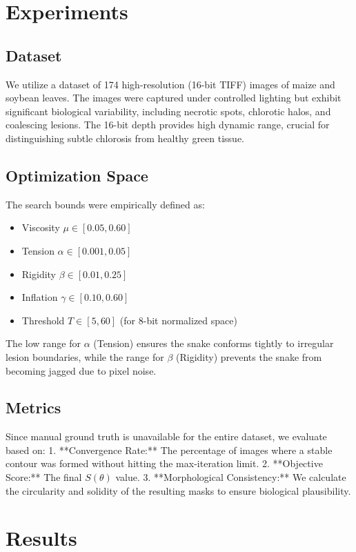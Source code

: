 \documentclass[journal]{IEEEtran}
\begin{document}
\section{Experiments}
\subsection{Dataset}
We utilize a dataset of 174 high-resolution (16-bit TIFF) images of maize and soybean leaves. The images were captured under controlled lighting but exhibit significant biological variability, including necrotic spots, chlorotic halos, and coalescing lesions. The 16-bit depth provides high dynamic range, crucial for distinguishing subtle chlorosis from healthy green tissue.

\subsection{Optimization Space}
The search bounds were empirically defined as:
\begin{itemize}
    \item Viscosity $\mu \in [0.05, 0.60]$
    \item Tension $\alpha \in [0.001, 0.05]$
    \item Rigidity $\beta \in [0.01, 0.25]$
    \item Inflation $\gamma \in [0.10, 0.60]$
    \item Threshold $T \in [5, 60]$ (for 8-bit normalized space)
\end{itemize}
The low range for $\alpha$ (Tension) ensures the snake conforms tightly to irregular lesion boundaries, while the range for $\beta$ (Rigidity) prevents the snake from becoming jagged due to pixel noise.

\subsection{Metrics}
Since manual ground truth is unavailable for the entire dataset, we evaluate based on:
1. **Convergence Rate:** The percentage of images where a stable contour was formed without hitting the max-iteration limit.
2. **Objective Score:** The final $S(\theta)$ value.
3. **Morphological Consistency:** We calculate the circularity and solidity of the resulting masks to ensure biological plausibility.

\section{Results}
\end{document}
